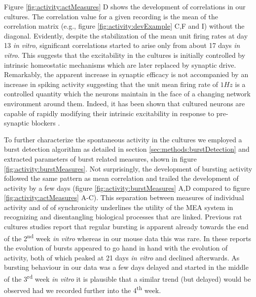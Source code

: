         Figure \ref{fig:activity:actMeasures} D shows the development of correlations in our cultures. The correlation value for a given recording is the mean of the correlation matrix (e.g., figure \ref{fig:activity:devExample} C,F and I) without the diagonal. Evidently, despite the stabilization of the mean unit firing rates at day 13 \textit{in vitro}, significant correlations started to arise only from about 17 days \textit{in vitro}. This suggests that the excitability in the cultures is initially controlled by intrinsic homeostatic mechanisms which are later replaced by synaptic drive. Remarkably, the apparent increase in synaptic efficacy is not accompanied by an increase in spiking activity suggesting that the unit mean firing rate of \(1 Hz\) is a controlled quantity which the neurons maintain in the face of a changing network environment around them. Indeed, it has been shown that cultured neurons are capable of rapidly modifying their intrinsic excitability in response to pre-synaptic blockers \cite{penn2016network}.


        To further characterize the spontaneous activity in the cultures we employed a burst detection algorithm as detailed in section \ref{sec:methods:burstDetection} and extracted parameters of burst related measures, shown in figure \ref{fig:activity:burstMeasures}. Not surprisingly, the development of bursting activity followed the same pattern as mean correlation and trailed the development of activity by a few days (figure \ref{fig:activity:burstMeasures} A,D compared to figure \ref{fig:activity:actMeasures} A-C). This separation between measures of individual activity and of of synchronicity underlines the utility of the MEA system in recognizing and disentangling biological processes that are linked. Previous rat cultures studies report that regular bursting is apparent already towards the end of the 2\textsuperscript{nd} week \textit{in vitro} \cite{van2004long,wagenaar2006extremely,chiappalone2006dissociated,bikbaev2015brain} whereas in our mouse data this was rare. In these reports the evolution of bursts appeared to go hand in hand with the evolution of activity, both of which peaked at 21 days \textit{in vitro} and declined afterwards. As bursting behaviour in our data was a few days delayed and started in the middle of the 3\textsuperscript{rd} week \textit{in vitro} it is plausible that a similar trend (but delayed) would be observed had we recorded further into the 4\textsuperscript{th} week.

